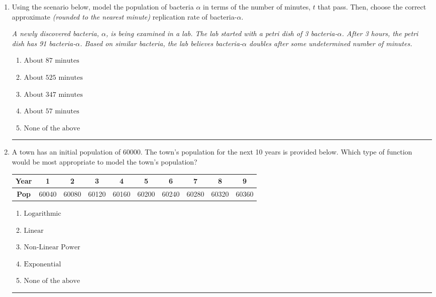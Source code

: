 \documentclass[14pt]{extbook}
\newcommand{\litem}[1]{\item#1\hspace*{-1cm}\rule{\textwidth}{0.4pt}}
\begin{document}
\begin{enumerate}
{\begin{enumerate}[label=\Alph*.]
\end{enumerate} }
\litem{
Using the scenario below, model the population of bacteria $\alpha$ in terms of the number of minutes, $t$ that pass. Then, choose the correct approximate \textit{(rounded to the nearest minute)} replication rate of bacteria-$\alpha$.
\begin{center}
    \textit{ A newly discovered bacteria, $\alpha$, is being examined in a lab. The lab started with a petri dish of 3 bacteria-$\alpha$. After 3 hours, the petri dish has 91 bacteria-$\alpha$. Based on similar bacteria, the lab believes bacteria-$\alpha$ doubles after some undetermined number of minutes. }
\end{center}
\begin{enumerate}[label=\Alph*.]
\item \( \text{About } 87 \text{ minutes} \)
\item \( \text{About } 525 \text{ minutes} \)
\item \( \text{About } 347 \text{ minutes} \)
\item \( \text{About } 57 \text{ minutes} \)
\item \( \text{None of the above} \)

\end{enumerate} }
\litem{
A town has an initial population of 60000. The town's population for the next 10 years is provided below. Which type of function would be most appropriate to model the town's population?

\begin{tabular}{c|c|c|c|c|c|c|c|c|c}
\textbf{Year} &1 &2 &3 &4 &5 &6 &7 &8 &9\tabularnewline \hline
\textbf{Pop} &60040 &60080 &60120 &60160 &60200 &60240 &60280 &60320 &60360\end{tabular}\begin{enumerate}[label=\Alph*.]
\item \( \text{Logarithmic} \)
\item \( \text{Linear} \)
\item \( \text{Non-Linear Power} \)
\item \( \text{Exponential} \)
\item \( \text{None of the above} \)


\end{enumerate}}
\end{enumerate}
\end{document}
